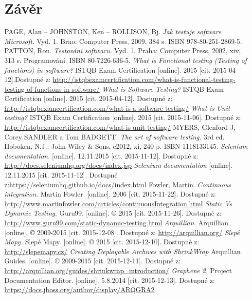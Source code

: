 \documentclass[
    color,   %
	table,   %
    twoside, %
]{fithesis3}
\begin{document}
\chapter{Závěr}
\renewcommand{\refname}{Seznam literatury}
\begin{thebibliography}{9}
PAGE, Alan – JOHNSTON, Ken – ROLLISON, Bj. \emph{Jak testuje software Microsoft.} Vyd. 1. Brno: Computer Press, 2009, 384 s. ISBN 978-80-251-2869-5.
PATTON, Ron. \emph{Testování softwaru.} Vyd. 1. Praha: Computer Press, 2002, xiv, 313 s. Programování. ISBN 80-7226-636-5. 
\emph{What is Functional testing (Testing of functions) in software?} ISTQB Exam Certification [online]. 2015 [cit. 2015-04-12].Dostupné z: \url{http://istqbexamcertification.com/what-is-functional-testing-testing-of-functions-in-software/}
\emph{What is Software Testing?} ISTQB Exam Certification [online]. 2015 [cit. 2015-04-12]. Dostupné z: \url{http://istqbexamcertification.com/what-is-a-software-testing/}
\emph{What is Unit testing?} ISTQB Exam Certification [online]. 2015 [cit. 2015-11-06]. Dostupné z: \url{http://istqbexamcertification.com/what-is-unit-testing/}
MYERS, Glenford J, Corey SANDLER a Tom BADGETT. \emph{The art of software testing.} 3rd ed. Hoboken, N.J.: John Wiley \& Sons, c2012, xi, 240 p. ISBN 1118133145.
\emph{Selenium documentation.} [online]. 12.11.2015 [cit. 2015-11-12]. Dostupné z: \url{http://docs.seleniumhq.org/docs/index.jsp}
\emph{Selenium documentation} [online]. 12.11.2015 [cit. 2015-11-12]. Dostupné z:\url{https://seleniumhq.github.io/docs/index.html}
Fowler, Martin. \emph{Continuous integration.} Martin Fowler. [online]. 2006 [cit. 2015-11-22]. Dostupné z: \url{http://www.martinfowler.com/articles/continuousIntegration.html}
\emph{Static Vs Dynamic Testing.} Guru99. [online]. © 2015 [cit. 2015-11-26]. Dostupné z: \url{http://www.guru99.com/static-dynamic-testing.html}
\emph{Arquillian.} Arquillian. [online]. © 2009-2015 [cit. 2015-12-08]. Dostupné z: \url{http://arquillian.org/}
\emph{Slepé Mapy.} Slepé Mapy. [online]. © 2015 [cit. 2015-12-10]. Dostupné z: \url{http://slepemapy.cz/}
\emph{Creating Deployable Archives with ShrinkWrap} Arquillian Guides. [online]. © 2009-2015 [cit. 2015-12-11]. Dostupné z: \url{http://arquillian.org/guides/shrinkwrap_introduction/}
\emph{Graphene 2.} Project Documentation Editor. [online]. 5.8.2014 [cit. 2015-12-13]. Dostupné z: \url{https://docs.jboss.org/author/display/ARQGRA2}

\end{thebibliography}
\end{document}
